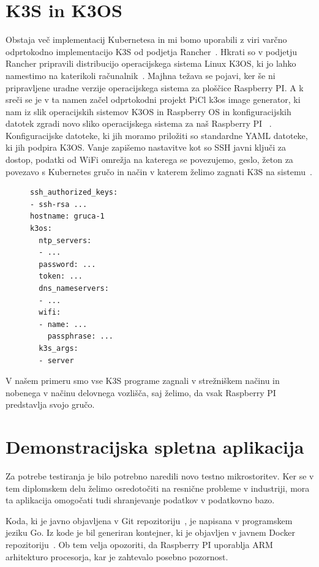 \documentclass[a4paper, 12pt]{book}
\begin{document}
\section{K3S in K3OS}
Obstaja več implementacij Kubernetesa in mi bomo uporabili z viri varčno odprtokodno implementacijo K3S od podjetja Rancher~\cite{k3s-info}.
Hkrati so v podjetju Rancher pripravili distribucijo operacijskega sistema Linux K3OS, ki jo lahko namestimo na katerikoli računalnik~\cite{k3os-git}. 
Majhna težava se pojavi, ker še ni pripravljene uradne verzije operacijskega sistema za ploščice Raspberry PI.
A k sreči se je v ta namen začel odprtokodni projekt PiCl k3os image generator, ki nam iz slik operacijskih sistemov K3OS in Raspberry OS in konfiguracijskih datotek zgradi novo sliko operacijskega sistema za naš Raspberry PI ~\cite{k3os-rpi-image-generator}.
Konfiguracijske datoteke, ki jih moramo priložiti so standardne YAML datoteke, ki jih podpira K3OS.
Vanje zapišemo nastavitve kot so SSH javni ključi za dostop, podatki od WiFi omrežja na katerega se povezujemo, geslo, žeton za povezavo s Kubernetes gručo in način v katerem želimo zagnati K3S na sistemu~\cite{k3os-git}.
\begin{figure}[h]
  \begin{verbatim}
ssh_authorized_keys:
- ssh-rsa ...
hostname: gruca-1
k3os:
  ntp_servers:
  - ...
  password: ...
  token: ...
  dns_nameservers:
  - ... 
  wifi:
  - name: ...
    passphrase: ...
  k3s_args:
  - server
\end{verbatim}
\end{figure}
  V našem primeru smo vse K3S programe zagnali v strežniškem načinu in nobenega v načinu delovnega vozlišča, saj želimo, da vsak Raspberry PI predstavlja svojo gručo.
\section{Demonstracijska spletna aplikacija}
Za potrebe testiranja je bilo potrebno naredili novo testno mikrostoritev.
Ker se v tem diplomskem delu želimo osredotočiti na resnične probleme v industriji, mora ta aplikacija omogočati tudi shranjevanje podatkov v podatkovno bazo.

Koda, ki je javno objavljena v Git repozitoriju~\cite{git-stateful-rest-sample}, je napisana v programskem jeziku Go.
Iz kode je bil generiran kontejner, ki je objavljen v javnem Docker repozitoriju~\cite{docker-stateful-rest-sample}.
Ob tem velja opozoriti, da Raspberry PI uporablja ARM arhitekturo procesorja, kar je zahtevalo posebno pozornost.
\end{document}
